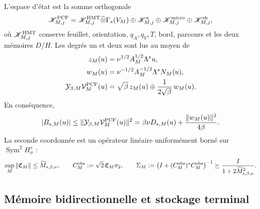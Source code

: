 L'espace d'état est la somme orthogonale
\begin{equation}
 \mathscr K_{M,j}^{\rm PCF}
 =\mathscr K_{M,j}^{\rm HMT}\widehat\otimes\Gamma_s(V_M)
 \oplus\mathscr K_{M,j}^{\kappa}
 \oplus\mathscr K_{M,j}^{\rm micro}
 \oplus\mathscr K_{M,j}^{\rm sh},
 \label{eq:ns-import-full-carrier}
\end{equation}
où \(\mathscr K_{M,j}^{\rm HMT}\) conserve feuillet, orientation, \(q_A,q_V,T\), bord, parcours et les deux mémoires \(D/H\). Les degrés un et deux sont lus au moyen de
\begin{equation}
 \begin{aligned}
 z_M(u)&=\nu^{1/2}A_M^{1/2}\Lambda^su,\\
 w_M(u)&=\nu^{-1/2}A_M^{-1/2}\Lambda^sN_M(u),\\
 \mathcal Y_{\beta,M}\mathcal V_M^{\rm PCF}(u)
 &=\sqrt\beta\,z_M(u)
   \oplus\frac{1}{2\sqrt\beta}\,w_M(u).
 \end{aligned}
 \label{eq:ns-import-degree-one-two-reader}
\end{equation}
En conséquence,
\begin{equation}
 |B_{s,M}(u)|
 \le
 \|\mathcal Y_{\beta,M}\mathcal V_M^{\rm PCF}(u)\|^2
 =\beta\nu D_{s,M}(u)+\frac{\|w_M(u)\|^2}{4\beta}.
 \label{eq:ns-import-young-port}
\end{equation}
La seconde coordonnée est un opérateur linéaire uniformément borné sur \(\operatorname{Sym}^2H^s_\sigma\) :
\begin{equation}
 \sup_M\|\mathfrak C_M\|
 \le\widetilde M_{s,\beta,\nu},
 \qquad
 C_M^{\rm obs}:=\sqrt2\,\mathfrak C_M\pi_2,
 \qquad
 \Sigma_M:=\bigl(I+(C_M^{\rm obs})^*C_M^{\rm obs}\bigr)^{-1}
 \succeq\frac{I}{1+2\widetilde M_{s,\beta,\nu}^2}.
 \label{eq:ns-import-uniform-graph}
\end{equation}

\subsection{Mémoire bidirectionnelle et stockage terminal}

